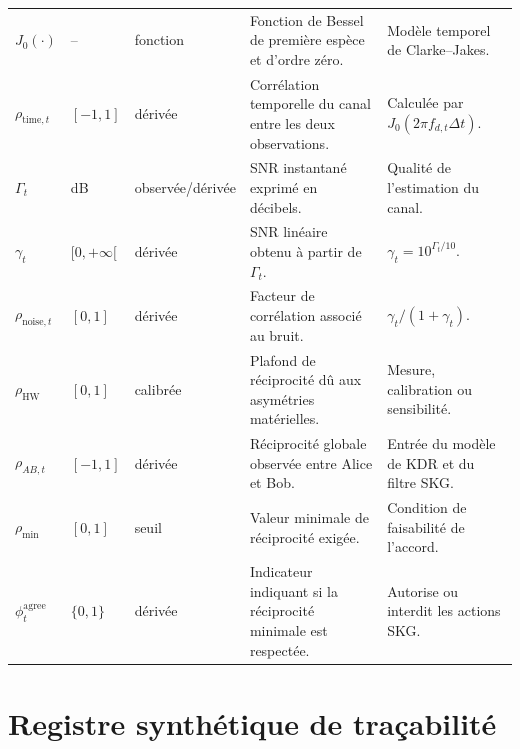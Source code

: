 \documentclass[conference,a4paper]{IEEEtran}
\begin{document}
\begin{table}[H]
\begin{tabularx}{\textwidth}{
@{}l
l
l
Y
Y@{}}
$J_0(\cdot)$
& --
& fonction
& Fonction de Bessel de première espèce et d'ordre zéro.
& Modèle temporel de Clarke--Jakes. \\

$\rho_{\mathrm{time},t}$
& $[-1,1]$
& dérivée
& Corrélation temporelle du canal entre les deux observations.
& Calculée par $J_0(2\pi f_{d,t}\Delta t)$. \\

$\Gamma_t$
& dB
& observée/dérivée
& SNR instantané exprimé en décibels.
& Qualité de l'estimation du canal. \\

$\gamma_t$
& $[0,+\infty[$
& dérivée
& SNR linéaire obtenu à partir de $\Gamma_t$.
& $\gamma_t=10^{\Gamma_t/10}$. \\

$\rho_{\mathrm{noise},t}$
& $[0,1]$
& dérivée
& Facteur de corrélation associé au bruit.
& $\gamma_t/(1+\gamma_t)$. \\

$\rho_{\mathrm{HW}}$
& $[0,1]$
& calibrée
& Plafond de réciprocité dû aux asymétries matérielles.
& Mesure, calibration ou sensibilité. \\

$\rho_{AB,t}$
& $[-1,1]$
& dérivée
& Réciprocité globale observée entre Alice et Bob.
& Entrée du modèle de KDR et du filtre SKG. \\

$\rho_{\min}$
& $[0,1]$
& seuil
& Valeur minimale de réciprocité exigée.
& Condition de faisabilité de l'accord. \\

$\phi_t^{\mathrm{agree}}$
& $\{0,1\}$
& dérivée
& Indicateur indiquant si la réciprocité minimale est respectée.
& Autorise ou interdit les actions SKG. \\

\bottomrule
\end{tabularx}
\end{table}


























\section{Registre synthétique de traçabilité}
\label{ann:traceabilite}
\end{document}
